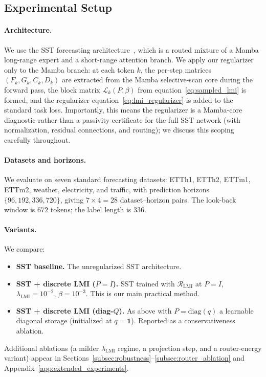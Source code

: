 \documentclass[10pt]{article} %
\def\eqref#1{equation~\ref{#1}}
\theoremstyle{definition}
\begin{document}
\subsection{Experimental Setup}
\label{subsec:experimental_setup}

\paragraph{Architecture.}
We use the SST forecasting architecture~\citep{XiongxiaoXuSST}, which is a routed mixture of a Mamba long-range expert and a short-range attention branch. We apply our regularizer only to the Mamba branch: at each token $k$, the per-step matrices $(F_k,G_k,C_k,D_k)$ are extracted from the Mamba selective-scan core during the forward pass, the block matrix $\mathcal{L}_k(P,\beta)$ from \eqref{eq:sampled_lmi} is formed, and the regularizer \eqref{eq:lmi_regularizer} is added to the standard task loss. Importantly, this means the regularizer is a Mamba-core diagnostic rather than a passivity certificate for the full SST network (with normalization, residual connections, and routing); we discuss this scoping carefully throughout.

\paragraph{Datasets and horizons.}
We evaluate on seven standard forecasting datasets: ETTh1, ETTh2, ETTm1, ETTm2, weather, electricity, and traffic, with prediction horizons $\{96, 192, 336, 720\}$, giving $7\times 4 = 28$ dataset--horizon pairs. The look-back window is $672$ tokens; the label length is $336$.

\paragraph{Variants.}
We compare:
\begin{itemize}
    \item \textbf{SST baseline.} The unregularized SST architecture.
    \item \textbf{SST + discrete LMI ($P=I$).} SST trained with $\mathcal{R}_{\mathrm{LMI}}$ at $P=I$, $\lambda_{\mathrm{LMI}}{=}10^{-2}$, $\beta{=}10^{-3}$. This is our main practical method.
    \item \textbf{SST + discrete LMI (diag-$Q$).} As above with $P=\mathrm{diag}(q)$ a learnable diagonal storage (initialized at $q=\mathbf{1}$). Reported as a conservativeness ablation.
\end{itemize}
Additional ablations (a milder $\lambda_{\mathrm{LMI}}$ regime, a projection step, and a router-energy variant) appear in Sections~\ref{subsec:robustness}--\ref{subsec:router_ablation} and Appendix~\ref{app:extended_experiments}.
\end{document}
